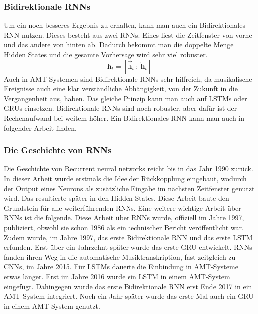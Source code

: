 

\subsubsection{Bidirektionale RNNs}
Um ein noch besseres Ergebnis zu erhalten, kann man auch ein Bidirektionales RNN nutzen.
Dieses besteht aus zwei RNNs.
Eines liest die Zeitfenster von vorne und das andere von hinten ab.
Dadurch bekommt man die doppelte Menge Hidden States und die gesamte Vorhersage wird sehr viel robuster.
\[
\mathbf{h}_t = \left[ \overrightarrow{\mathbf{h}}_t \ ;\ \overleftarrow{\mathbf{h}}_t \right]
\]
Auch in AMT-Systemen sind Bidirektionale RNNs sehr hilfreich,
da musikalische Ereignisse auch eine klar verständliche Abhängigkeit, von der Zukunft in die Vergangenheit aus, haben.
Das gleiche Prinzip kann man auch auf LSTMs oder GRUs einsetzen.
Bidirektionale RNNs sind noch robuster, aber dafür ist der Rechenaufwand bei weitem höher.
Ein Bidirektionales RNN kann man auch in folgender Arbeit finden.
\cite{hawthorne2017onsets}

\subsubsection{Die Geschichte von RNNs}
Die Geschichte von Recurrent neural networks reicht bis in das Jahr 1990 zurück.
\cite{elman1990finding}
In dieser Arbeit wurde erstmals die Idee der Rückkopplung eingebaut,
wodurch der Output eines Neurons als zusätzliche Eingabe im nächsten Zeitfenster genutzt wird.
Das resultierte später in den Hidden States.
Diese Arbeit baute den Grundstein für alle weiterführenden RNNs.
Eine weitere wichtige Arbeit über RNNs ist die folgende.
\cite{jordan1997serial}
Diese Arbeit über RNNs wurde, offiziell im Jahre 1997, publiziert,
obwohl sie schon 1986 als ein technischer Bericht veröffentlicht war.
Zudem wurde, im Jahre 1997, das erste Bidirektionale RNN
\cite{schuster1997bidirectional}
und das erste LSTM erfunden.
\cite{hochreiter1997long}
Erst über ein Jahrzehnt später wurde das erste GRU entwickelt.
\cite{chung2014empirical}
RNNs fanden ihren Weg in die automatische Musiktranskription, fast zeitgleich zu CNNs, im Jahre 2015.
\cite{sigtia2015hybrid}
Für LSTMs dauerte die Einbindung in AMT-Systeme etwas länger.
Erst im Jahre 2016 wurde ein LSTM in einem AMT-System eingefügt.
\cite{sigtia2016end}
Dahingegen wurde das erste Bidirektionale RNN erst Ende 2017 in ein AMT-System integriert.
\cite{hawthorne2017onsets}
Noch ein Jahr später wurde das erste Mal auch ein GRU in einem AMT-System genutzt.
\cite{jung2018adaptive}

